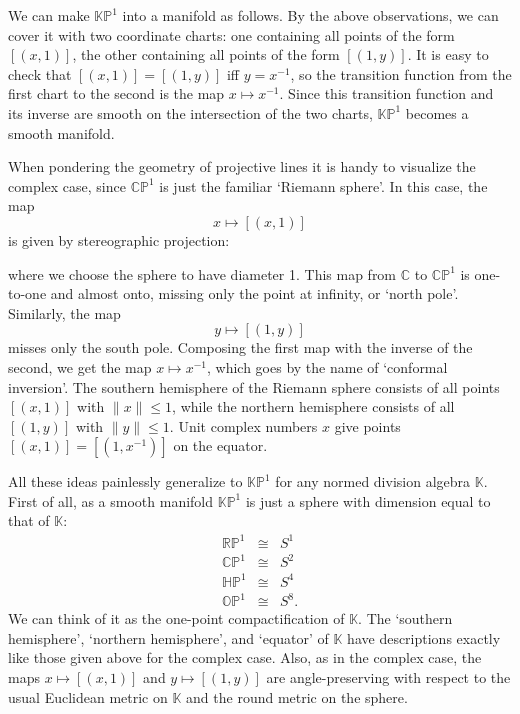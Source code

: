\documentclass[12pt]{article}
\newcommand\C{{\mathbb C}}
\newcommand\K{{\mathbb K}}
\newcommand\RP{{\mathbb {RP}}}
\newcommand\CP{{\mathbb {CP}}}
\newcommand\HP{{\mathbb {HP}}}
\newcommand\KP{{\mathbb {KP}}}
\newcommand\OP{{\mathbb {OP}}}
\newcommand{\iso}{\cong}
\begin{document}
We can make $\KP^1$ into a manifold as follows.  By the above 
observations, we can cover it with two coordinate charts: one containing 
all points of the form $[(x,1)]$, the other containing all points of the 
form $[(1,y)]$.   It is easy to check that $[(x,1)] = [(1,y)]$ iff $y = 
x^{-1}$, so the transition function from the first chart to the second 
is the map $x \mapsto x^{-1}$.  Since this transition function and its 
inverse are smooth on the intersection of the two charts, $\KP^1$ 
becomes a smooth manifold.  

When pondering the geometry of projective lines it is handy to
visualize the complex case, since $\CP^1$ is just the familiar
`Riemann sphere'.  In this case, the map   
\[    x \mapsto [(x,1)]    \]  
is given by stereographic projection: 
  
\begin{figure}[h]   
\centerline{\epsfysize=1.5in}   
\label{stereo}   
\end{figure}   
  
\noindent  
where we choose the sphere to have diameter 1.   This map from $\C$ to 
$\CP^1$ is one-to-one and almost onto, missing only the point at 
infinity, or `north pole'.  Similarly, the map  
\[    y \mapsto [(1,y)]    \]  
misses only the south pole. Composing the first map with the inverse of 
the second, we get the map  $x \mapsto x^{-1}$, which goes by the name 
of `conformal inversion'.  The southern hemisphere of the Riemann 
sphere consists of all points $[(x,1)]$ with $\|x\| \le 1$, while the 
northern hemisphere consists of all $[(1,y)]$ with $\|y\| \le 1$.  Unit 
complex numbers $x$ give points $[(x,1)] = [(1,x^{-1})]$ on the equator.    
  
All these ideas painlessly generalize to $\KP^1$ for any normed division  
algebra $\K$.  First of all, as a smooth manifold $\KP^1$ is just a   
sphere with dimension equal to that of $\K$:  
\[  
\begin{array}{ccl}       
          \RP^1 &\iso& S^1   \\  
          \CP^1 &\iso& S^2   \\  
          \HP^1 &\iso& S^4   \\  
          \OP^1 &\iso& S^8.  
\end{array}   
\]  
We can think of it as the one-point compactification of $\K$.   The  
`southern hemisphere', `northern hemisphere', and `equator' of $\K$ have 
descriptions exactly like those given above for the complex case.  Also, 
as in the complex case, the maps $x \mapsto [(x,1)]$ and $y \mapsto [(1,y)]$ 
are angle-preserving with respect to the usual Euclidean metric on $\K$ 
and the round metric on the sphere.   
\end{document}
